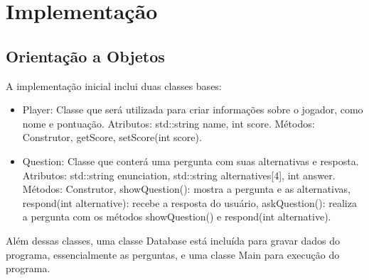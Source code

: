 \documentclass[rel_mlp]{iiufrgs}
\begin{document}
\chapter{Implementação}\label{imp}
\section{Orientação a Objetos}
A implementação inicial inclui duas classes bases:
\begin{itemize}
	\item Player: Classe que será utilizada para criar informações sobre o jogador, como nome e pontuação.
	\subitem Atributos: std::string name, int score.
	\subitem Métodos: Construtor, getScore, setScore(int score).
	\item Question: Classe que conterá uma pergunta com suas alternativas e resposta.
	\subitem Atributos: std::string enunciation, std::string alternatives[4], int answer.
	\subitem Métodos: Construtor, showQuestion(): mostra a pergunta e as alternativas, respond(int alternative): recebe a resposta do usuário, askQuestion(): realiza a pergunta com os métodos showQuestion() e respond(int alternative).
\end{itemize}
Além dessas classes, uma classe Database está incluída para gravar dados do programa, essencialmente as perguntas, e uma classe Main para execução do programa.
\end{document}
